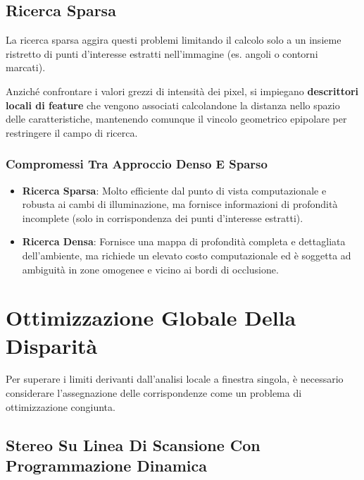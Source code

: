 ﻿\documentclass[11pt, a4paper]{article}
\begin{document}
\subsection{Ricerca Sparsa}

La ricerca sparsa aggira questi problemi limitando il calcolo solo a un insieme ristretto di punti d'interesse estratti nell'immagine (es. angoli o contorni marcati).


Anziché confrontare i valori grezzi di intensità dei pixel, si impiegano \textbf{descrittori locali di feature} che vengono associati calcolandone la distanza nello spazio delle caratteristiche, mantenendo comunque il vincolo geometrico epipolare per restringere il campo di ricerca.

\subsubsection{Compromessi Tra Approccio Denso E Sparso}
\begin{itemize}
    \item \textbf{Ricerca Sparsa}: Molto efficiente dal punto di vista computazionale e robusta ai cambi di illuminazione, ma fornisce informazioni di profondità incomplete (solo in corrispondenza dei punti d'interesse estratti).
    \item \textbf{Ricerca Densa}: Fornisce una mappa di profondità completa e dettagliata dell'ambiente, ma richiede un elevato costo computazionale ed è soggetta ad ambiguità in zone omogenee e vicino ai bordi di occlusione.
\end{itemize}

\newpage

\section{Ottimizzazione Globale Della Disparità}

Per superare i limiti derivanti dall'analisi locale a finestra singola, è necessario considerare l'assegnazione delle corrispondenze come un problema di ottimizzazione congiunta.

\subsection{Stereo Su Linea Di Scansione Con Programmazione Dinamica}
\end{document}
